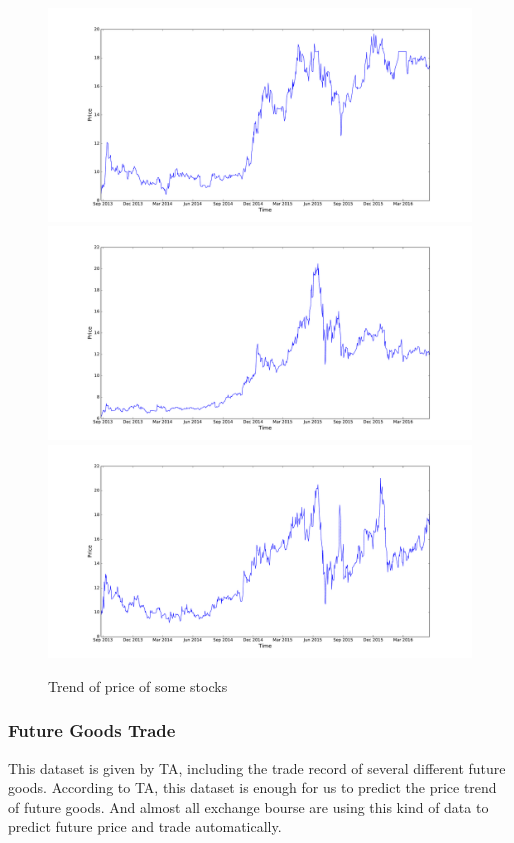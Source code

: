 \begin{figure}
\centering
\includegraphics[width=1.0\textwidth]{trend1.pdf}
\includegraphics[width=1.0\textwidth]{trend2.pdf}
\includegraphics[width=1.0\textwidth]{trend3.pdf}
\caption{\label{fig:trend}Trend of price of some stocks}
\end{figure}

\subsubsection{Future Goods Trade}
This dataset is given by TA, including the trade record of several different future goods. According to TA, this dataset is enough for us to predict the price trend of future goods. And almost all exchange bourse are using this kind of data to predict future price and trade automatically.

